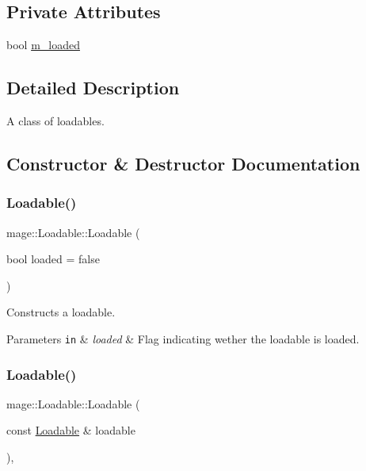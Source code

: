 \subsection*{Private Attributes}
\begin{DoxyCompactItemize}
\item 
bool \hyperlink{classmage_1_1_loadable_a993963fbfeb0f2e2ab9616bf7ef6a0f7}{m\+\_\+loaded}
\end{DoxyCompactItemize}


\subsection{Detailed Description}
A class of loadables. 

\subsection{Constructor \& Destructor Documentation}
\hypertarget{classmage_1_1_loadable_afbdcb287b5e20583899a27a1c244bc7d}{}\label{classmage_1_1_loadable_afbdcb287b5e20583899a27a1c244bc7d} 
\subsubsection{\texorpdfstring{Loadable()}{Loadable()}\hspace{0.1cm}{\footnotesize\ttfamily [1/2]}}
{\footnotesize\ttfamily mage\+::\+Loadable\+::\+Loadable (\begin{DoxyParamCaption}\item[{bool}]{loaded = {\ttfamily false} }\end{DoxyParamCaption})\hspace{0.3cm}{\ttfamily [protected]}}

Constructs a loadable.


\begin{DoxyParams}[1]{Parameters}
\mbox{\tt in}  & {\em loaded} & Flag indicating wether the loadable is loaded. \\
\hline
\end{DoxyParams}
\hypertarget{classmage_1_1_loadable_a21364449c045d579cb6090347d83cd54}{}\label{classmage_1_1_loadable_a21364449c045d579cb6090347d83cd54} 
\subsubsection{\texorpdfstring{Loadable()}{Loadable()}\hspace{0.1cm}{\footnotesize\ttfamily [2/2]}}
{\footnotesize\ttfamily mage\+::\+Loadable\+::\+Loadable (\begin{DoxyParamCaption}\item[{const \hyperlink{classmage_1_1_loadable}{Loadable} \&}]{loadable }\end{DoxyParamCaption})\hspace{0.3cm}{\ttfamily [protected]}, {\ttfamily [default]}}

